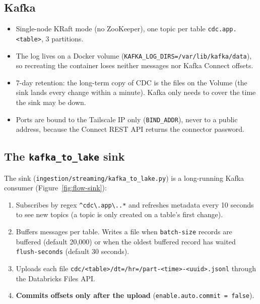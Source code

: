 \documentclass[12pt,a4paper]{article}
\newcommand{\code}[1]{\texttt{#1}}
\begin{document}
\subsection{Kafka}
\begin{itemize}
  \item Single-node KRaft mode (no ZooKeeper), one topic per table \code{cdc.app.<table>}, 3 partitions.
  \item The log lives on a Docker volume (\code{KAFKA\_LOG\_DIRS=/var/lib/kafka/data}), so recreating the container
        loses neither messages nor Kafka Connect offsets.
  \item 7-day retention: the long-term copy of CDC is the files on the Volume (the sink lands every change within a
        minute). Kafka only needs to cover the time the sink may be down.
  \item Ports are bound to the Tailscale IP only (\code{BIND\_ADDR}), never to a public address, because the Connect
        REST API returns the connector password.
\end{itemize}

\subsection{The \code{kafka\_to\_lake} sink}
The sink (\code{ingestion/streaming/kafka\_to\_lake.py}) is a long-running Kafka consumer (Figure~\ref{fig:flow-sink}):
\begin{enumerate}
  \item Subscribes by regex \code{\^{}cdc\textbackslash.app\textbackslash..*} and refreshes metadata every
        10 seconds to see new topics (a topic is only created on a table's first change).
  \item Buffers messages per table. Writes a file when \code{batch-size} records are buffered (default 20,000) or when
        the oldest buffered record has waited \code{flush-seconds} (default 30 seconds).
  \item Uploads each file \code{cdc/<table>/dt=/hr=/part-<time>-<uuid>.jsonl} through the Databricks Files API.
  \item \textbf{Commits offsets only after the upload} (\code{enable.auto.commit = false}).
\end{enumerate}
\end{document}
